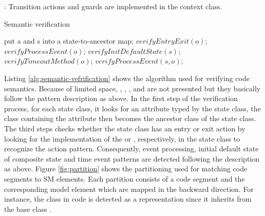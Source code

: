 : Transition actions and guards are implemented in the context class.

\begin{algorithm}[H]
  \caption{Semantic verification
    \label{alg:semantic-vefrification}}
  \begin{algorithmic}[1]
        			put a and s into a state-to-ancestor map;
        		\EndIf
        	\EndFor
        				\State $verifyEntryExit(o)$; 	
        			\State $verifyProcessEvent(o)$;
        			\State $verifyInitDefaultState(s)$;
        			\State $verifyTimeoutMethod(o)$;
        			\State $verifyProcessEvent(s,o)$;
        		\EndIf	
        	\EndFor
    	\EndFor
  \end{algorithmic}
\end{algorithm}

Listing \ref{alg:semantic-vefrification} shows the algorithm used for verifying code semantics. Because of limited space, , , ,  and  are not presented but they basically follow the pattern description as above. In the first step of the verification process, for each state class, it looks for an attribute typed by the state class, the class containing the attribute then becomes the ancestor class of the state class. The third steps checks whether the state class has an entry or exit action by looking for the implementation of the  or , respectively, in the state class to recognize the  action pattern. Consequently, event processing, initial default state of composite state and time event patterns are detected following the description as above.  Figure \ref{fig:partition} shows the partitioning used for matching code segments to SM elements. Each partition consists of a code segment and the corresponding model element which are mapped in the backward direction. For instance, the  class in code is detected as a representation since it inherits from the base class .  
 
